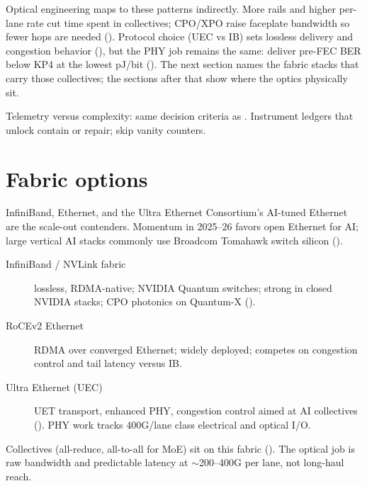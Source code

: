 Optical engineering maps to these patterns indirectly. More rails and higher
per-lane rate cut time spent in collectives; CPO/XPO raise faceplate bandwidth so
fewer hops are needed (). Protocol
choice (UEC vs IB) sets lossless delivery and congestion behavior
(), but the PHY job remains the same: deliver pre-FEC
BER below KP4 at the lowest pJ/bit (). The next section
names the fabric stacks that carry those collectives; the sections after that
show where the optics physically sit.



Telemetry versus complexity: same decision criteria as
. Instrument ledgers that unlock contain or
repair; skip vanity counters.

\section{Fabric options}
\label{sec:fabric-protocols}

InfiniBand, Ethernet, and the Ultra Ethernet Consortium's AI-tuned Ethernet are
the scale-out contenders. Momentum in 2025--26 favors open Ethernet for AI; large
vertical AI stacks commonly use Broadcom Tomahawk switch silicon
().

\begin{description}
\item[InfiniBand / NVLink fabric] lossless, RDMA-native; NVIDIA Quantum switches;
      strong in closed NVIDIA stacks; CPO photonics on Quantum-X ().
\item[RoCEv2 Ethernet] RDMA over converged Ethernet; widely deployed; competes on
      congestion control and tail latency versus IB.
\item[Ultra Ethernet (UEC)] UET transport, enhanced PHY, congestion control aimed
      at AI collectives (). PHY work tracks 400G/lane class electrical
      and optical I/O.
\end{description}

Collectives (all-reduce, all-to-all for MoE) sit on this fabric
(). The optical job is raw bandwidth and predictable
latency at $\sim$200--400G per lane, not long-haul reach.

